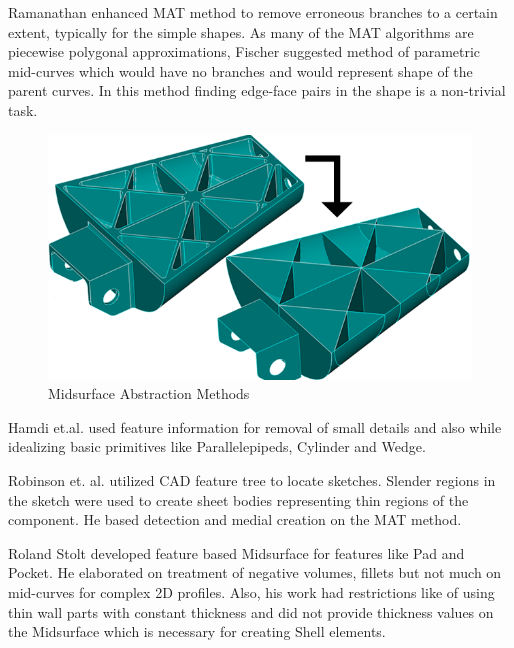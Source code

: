 Ramanathan \citep{Ramanathan2004} enhanced MAT method to remove erroneous branches to a certain extent, typically for the simple shapes. As many of the MAT algorithms are piecewise polygonal approximations, Fischer \citep{Elber1999} suggested method of parametric mid-curves which would have no branches and would represent shape of the parent curves. In this method finding edge-face pairs in the shape is a non-trivial task. 

	
	
	\begin{figure}
	\centering
	\includegraphics[scale=0.4]{..//Common/images//Midsurface.png}
	\caption{Midsurface Abstraction Methods}
	\label{Abstraction}
	\vspace{-1cm}
	\end{figure}



Hamdi et.al. \citep{Hamdi2005} used feature information for removal of small details and also while idealizing basic primitives like Parallelepipeds, Cylinder and Wedge. 

Robinson et. al.  \citep{Robinson2006} utilized CAD feature tree to locate sketches. Slender regions in the sketch were used to create sheet bodies representing thin regions of the component. He based detection and medial creation on the MAT method. 

Roland Stolt \citep{Stolt2005, Sunnersjo2005, Stolt2006} developed feature based Midsurface for features like Pad and Pocket. He  elaborated on treatment of negative volumes, fillets but not much on mid-curves for complex 2D profiles. Also, his work had restrictions like of using thin wall parts with constant thickness and did not provide thickness values on the Midsurface which is necessary for creating Shell elements. 

